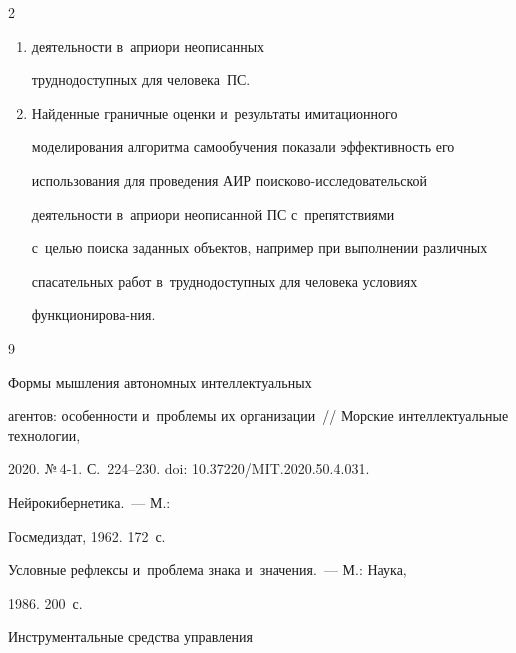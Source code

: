 \begin{multicols}{2}
\begin{enumerate}[1.]
\item[\,]


 деятельности в~априори неописанных 


труднодоступных для человека~ПС.


  \item Найденные граничные оценки и~\mbox{результаты} имитационного 


моделирования алгоритма самообуче\-ния показали эф\-фек\-тив\-ность его 


использования для проведения АИР по\-иско\-во-ис\-сле\-до\-ва\-тель\-ской 


деятельности в~априори неописанной ПС с~препятствиями 


с~\mbox{целью} поиска заданных объектов, например при выполнении различных 


спасательных работ в~труд\-но\-до\-ступ\-ных для человека условиях 


функ\-цио\-ни\-ро\-ва-\linebreak ния. 


  \end{enumerate}


   


{\small\frenchspacing


 {%




 \begin{thebibliography}{9}




   Формы мышления автономных интеллектуальных 


агентов: особенности и~проб\-ле\-мы их организации~// Морские интеллектуальные технологии, 


2020. №\,4-1. С.~224--230. doi: 10.37220/MIT.2020.50.4.031.




   Нейрокибернетика.~--- М.: 


Госмедиздат, 1962. 172~с.




   Условные рефлексы и~проб\-ле\-ма знака и~значения.~--- М.: Наука, 


1986. 200~с.




   Инструментальные средства управ\-ле\-ния 



\end{thebibliography}}}
\end{multicols}
